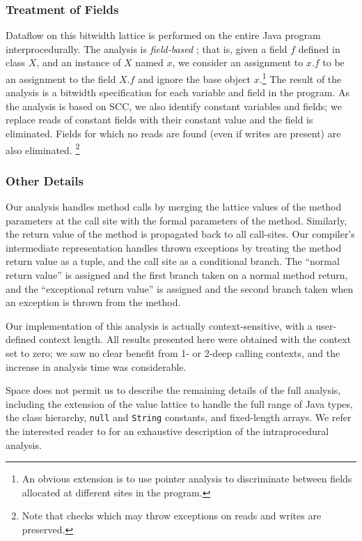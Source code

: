 \documentclass{sig-alt-full}
\begin{document}
\subsubsection{Treatment of Fields}
Dataflow on this bitwidth lattice is performed on the entire Java
program interprocedurally.  The analysis is
{\it field-based} \cite{heintze01}; that is, given a field $f$ defined in
class $X$, and an instance of $X$ named $x$, we consider an assignment
to $x.f$ to be an assignment to the field $X.f$ and ignore the base
object $x$.\footnote{An obvious extension is to use pointer
analysis to discriminate between fields allocated at different sites
in the program.}  The result of the analysis is a bitwidth
specification for each variable and field in the program.  As the
analysis is based on SCC, we also identify constant variables and
fields; we replace reads of constant fields with their constant
value and the field is eliminated.  Fields for which no reads are
found (even if writes are present) are also eliminated.%
\footnote{Note that checks which may throw exceptions on reads and
  writes are preserved.}

\subsubsection{Other Details}
Our analysis handles method calls by merging the lattice values of the
method parameters at the call site with the formal parameters of the
method.  Similarly, the return value of the method is propagated back
to all call-sites.  Our compiler's intermediate representation handles
thrown exceptions by treating the method return value as a tuple, and
the call site as a conditional branch.  The ``normal return value'' is
assigned and the first branch taken on a normal method return, and the
``exceptional return value'' is assigned and the second branch taken when an
exception is thrown from the method.

Our implementation of this analysis is actually context-sensitive,
with a user-defined context length.  All results presented here were
obtained with the context set to zero; we saw no clear benefit from 1-
or 2-deep calling contexts, and the increase in analysis
time was considerable.

Space does not permit us to describe the remaining details of the full
analysis, including the extension of the value
lattice to handle the full range of Java types, the class hierarchy,
{\tt null} and {\tt String} constants, and fixed-length arrays.
We refer the interested reader to \cite{ananian99:tech} for an
exhaustive description of the intraprocedural analysis.
\end{document}
